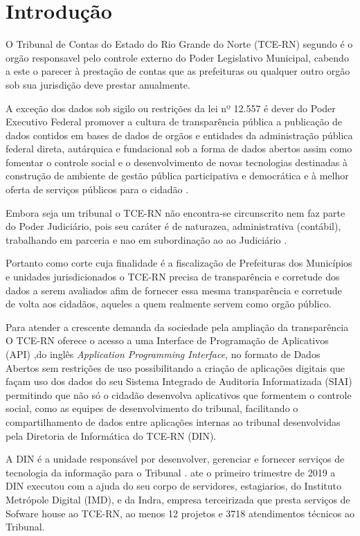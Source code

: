 \chapter[Introdução]{Introdução}
\label{ch:introducao}

  O Tribunal de Contas do Estado do Rio Grande do Norte (TCE-RN) segundo \cite{Legislativa} é o orgão responsavel pelo controle externo do Poder Legislativo Municipal, cabendo a este o parecer à prestação de contas que as prefeituras ou qualquer outro orgão sob sua jurisdição deve prestar anualmente.

  A exceção dos dados sob sigilo ou restrições da lei nº 12.557 \cite{lei_12527} é dever do Poder Executivo Federal promover a cultura de transparência pública a publicação de dados contidos em bases de dados de orgãos e entidades da administração pública federal direta, autárquica e fundacional sob a forma de dados abertos assim como fomentar o controle social e o desenvolvimento de novas tecnologias destinadas à construção de ambiente de gestão pública participativa e democrática e à melhor oferta de serviços públicos para o cidadão \cite{dec_8777}.

  Embora seja um tribunal o TCE-RN não encontra-se circunscrito nem faz parte do Poder Judiciário, pois seu caráter é de naturazea, administrativa (contábil), trabalhando em parceria e nao em subordinação ao  ao Judiciário \cite{barreto_tribunais}.

  Portanto como corte cuja finalidade é a fiscalização de Prefeituras dos Municípios e unidades jurisdicionados o TCE-RN precisa de transparência e corretude dos dados a serem avaliados afim de fornecer essa mesma transparência e corretude de volta aos cidadãos, aqueles a quem realmente servem como orgão público.

  Para atender a crescente demanda da sociedade pela ampliação da transparência O TCE-RN oferece o acesso a uma Interface de Programação de Aplicativos (API) ,do inglês \textit{Application Programming Interface}, no formato de Dados Abertos sem restrições de uso possibilitando a criação de aplicações digitais \cite{dados_abertos_tcern} que façam uso dos dados do seu Sistema Integrado de Auditoria Informatizada (SIAI) permitindo que não só o cidadão desenvolva aplicativos que formentem o controle social, como as equipes de desenvolvimento do tribunal, facilitando o compartilhamento de dados entre aplicações internas ao tribunal desenvolvidas pela Diretoria de Informática do TCE-RN (DIN).

  A DIN é a unidade responsável por desenvolver, gerenciar e fornecer serviços de tecnologia da informação para o Tribunal \cite{relatorio_trimestral}. ate o primeiro trimestre de 2019 a DIN executou com a ajuda do seu corpo de servidores, estagiarios, do Instituto Metrópole Digital (IMD), e da Indra, empresa terceirizada que presta serviços de Sofware house ao TCE-RN, ao menos 12 projetos e 3718 atendimentos técnicos ao Tribunal.

